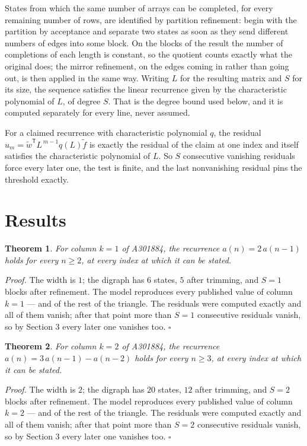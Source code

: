 \documentclass[11pt]{article}
\newtheorem{theorem}{Theorem}
\theoremstyle{definition}
\begin{document}
States from which the same number of arrays can be completed, for every remaining number of rows, are identified by partition refinement: begin with the partition by acceptance and separate two states as soon as they send different numbers of edges into some block. On the blocks of the result the number of completions of each length is constant, so the quotient counts exactly what the original does; the mirror refinement, on the edges coming in rather than going out, is then applied in the same way. Writing $L$ for the resulting matrix and $S$ for its size, the sequence satisfies the linear recurrence given by the characteristic polynomial of $L$, of degree $S$. That is the degree bound used below, and it is computed separately for every line, never assumed.

For a claimed recurrence with characteristic polynomial $q$, the residual $u_m = \tilde w^{\mathsf T}L^{\,m-1}q(L)\tilde f$ is exactly the residual of the claim at one index and itself satisfies the characteristic polynomial of $L$. So $S$ consecutive vanishing residuals force every later one, the test is finite, and the last nonvanishing residual pins the threshold exactly.

\section{Results}

\begin{theorem} For column $k = 1$ of A301884, the recurrence $a(n) = 2\,a(n-1)$ holds for every $n \ge 2$, at every index at which it can be stated.\end{theorem}

{\itshape Proof.} The width is $1$; the digraph has $6$ states, $5$ after trimming, and $S = 1$ blocks after refinement. The model reproduces every published value of column $k = 1$ --- and of the rest of the triangle. The residuals were computed exactly and all of them vanish; after that point more than $S = 1$ consecutive residuals vanish, so by Section 3 every later one vanishes too. $\square$

\begin{theorem} For column $k = 2$ of A301884, the recurrence $a(n) = 3\,a(n-1) - a(n-2)$ holds for every $n \ge 3$, at every index at which it can be stated.\end{theorem}

{\itshape Proof.} The width is $2$; the digraph has $20$ states, $12$ after trimming, and $S = 2$ blocks after refinement. The model reproduces every published value of column $k = 2$ --- and of the rest of the triangle. The residuals were computed exactly and all of them vanish; after that point more than $S = 2$ consecutive residuals vanish, so by Section 3 every later one vanishes too. $\square$
\end{document}
